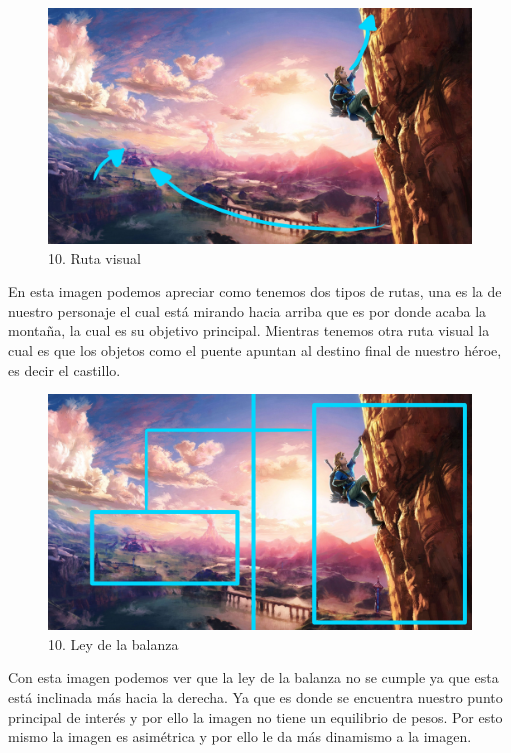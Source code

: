 \documentclass[12pt]{article}
\begin{document}
    \begin{figure}[H]
      \centering
      \includegraphics[width=\textwidth]{images/Selena/10 flechas.jpg}
      \caption{\small 10. Ruta visual}
    \end{figure}
    En esta imagen podemos apreciar como tenemos dos tipos de rutas, una es la de nuestro personaje el cual está mirando hacia arriba que es por donde acaba la montaña, la cual es su objetivo principal. Mientras tenemos otra ruta visual la cual es que los objetos como el puente apuntan al destino final de nuestro héroe, es decir el castillo.
    \begin{figure}[H]
      \centering
      \includegraphics[width=\textwidth]{images/Selena/10 balanza.jpg}
      \caption{\small 10. Ley de la balanza}
    \end{figure}
    Con esta imagen podemos ver que la ley de la balanza no se cumple ya que esta está inclinada más hacia la derecha. Ya que es donde se encuentra nuestro punto principal de interés y por ello la imagen no tiene un equilibrio de pesos. Por esto mismo la imagen es asimétrica y por ello le da más dinamismo a la imagen.  
\end{document}
